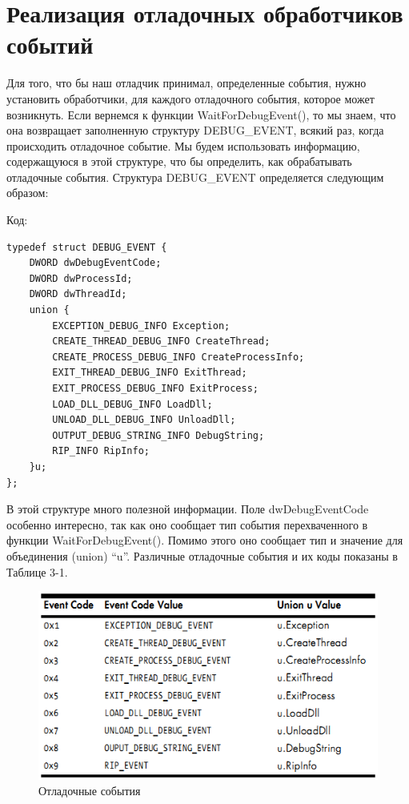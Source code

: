 \documentclass[12pt, a4paper, oneside]{book}
\begin{document}
\section{Реализация отладочных обработчиков событий}

Для того, что бы наш отладчик принимал, определенные события, нужно установить обработчики, для каждого отладочного события, которое может возникнуть. Если вернемся к функции WaitForDebugEvent(), то мы знаем, что она возвращает заполненную структуру DEBUG\_EVENT, всякий раз, когда происходить отладочное событие. Мы будем использовать информацию, содержащуюся в этой структуре, что бы определить, как обрабатывать отладочные события. Структура DEBUG\_EVENT определяется следующим образом:

Код:
\begin{verbatim}
typedef struct DEBUG_EVENT {
    DWORD dwDebugEventCode;
    DWORD dwProcessId;
    DWORD dwThreadId;
    union {
        EXCEPTION_DEBUG_INFO Exception;
        CREATE_THREAD_DEBUG_INFO CreateThread;
        CREATE_PROCESS_DEBUG_INFO CreateProcessInfo;
        EXIT_THREAD_DEBUG_INFO ExitThread;
        EXIT_PROCESS_DEBUG_INFO ExitProcess;
        LOAD_DLL_DEBUG_INFO LoadDll;
        UNLOAD_DLL_DEBUG_INFO UnloadDll;
        OUTPUT_DEBUG_STRING_INFO DebugString;
        RIP_INFO RipInfo;
    }u;
};
\end{verbatim}

В этой структуре много полезной информации. Поле dwDebugEventCode особенно интересно, так как оно сообщает тип события перехваченного в функции WaitForDebugEvent(). Помимо этого оно сообщает тип и значение для объединения (union) “u”. Различные отладочные события и их коды показаны в Таблице 3-1.

\begin{figure}
  \center
  \includegraphics{./pic/chap3/1.png}
  \caption{Отладочные события}
\end{figure}
\end{document}
